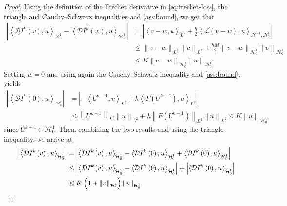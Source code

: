 \documentclass[11pt,a4paper,reqno]{amsart}
\numberwithin{equation}{section}
\theoremstyle{plain}
\theoremstyle{definition}
\def\ud{\mathrm d}
\newcommand{\ip}[1]{\left\langle#1\right\rangle}
\newcommand{\E}{\mathbb{E}}
\newcommand{\cL}{\mathcal{L}}
\newcommand{\cH}{\mathcal{H}}
\newcommand{\D}{\mathcal{D}}
\newcommand{\norm}[1]{\left\|#1 \right\|} %
\newcommand{\abs}[1]{\left|#1\right|} %
\begin{document}
\begin{proof}
Using the definition of the Fr\'echet derivative in \eqref{eq:frechet-loss}, the triangle and Cauchy--Schwarz inequalities and \cref{ass:bound}, we get that
\begin{align*}
\abs{\ip{\D I^k \left( v \right), u}_{\cH_0^1} - \ip{\D I^k \left( w \right), u}_{\cH_0^1}} 
    &=  \abs{\ip{v-w,u}_{L^2} + \frac{h}{2}\ip{\cL (v-w),u}_{\cH^{-1},\cH_0^1}} \\  
    &\leq \norm{v-w}_{L^2} \norm{u}_{L^2}+ \frac{hM}{2}\norm{v-w}_{\cH_0^1}\norm{u}_{\cH_0^1} \\ 
    &\le K  \norm{v - w}_{\cH_0^1 }  \norm{u}_{\cH_0^1 }.
\end{align*} 
Setting $w=0$ and using again the Cauchy--Schwarz inequality and \cref{ass:bound}, yields
\begin{align*}
\abs{\ip{\D I^k \left( 0 \right), u}_{\cH_0^1}} 
    & = \left| -\ip{U^{k-1},u}_{L^2} +h\ip{F(U^{k-1}),u}_{L^2} \right| \\
    & \le \norm{U^{k-1}}_{L^2}\norm{u}_{L^2}+h\norm{F(U^{k-1})}_{L^2} \norm{u}_{L^2} 
    \leq K \norm{u}_{\cH_0^1 },
\end{align*}
since $U^{k-1} \in \cH_0^1$. 
Then, combining the two results and using the triangle inequality, we arrive at
\begin{align*}
\abs{\ip{\D I^k \left( v \right), u}_{\cH_0^1}} 
    & = \abs{\ip{\D I^k \left( v \right), u}_{\cH_0^1} - \ip{\D I^k \left( 0 \right), u}_{\cH_0^1} + \ip{\D I^k \left( 0 \right), u}_{\cH_0^1}} \\ 
    & \leq \abs{\ip{\D I^k \left( v \right), u}_{\cH_0^1} - \ip{\D I^k \left( 0 \right), u}_{\cH_0^1}} + \abs{\ip{\D I^k \left( 0 \right), u}_{\cH_0^1}} \\
    & \leq K \left( 1 + \norm{v}_{\cH_0^1 } \right)  \norm{u}_{\cH_0^1 } . \qedhere
\end{align*}
\end{proof}
\end{document}
